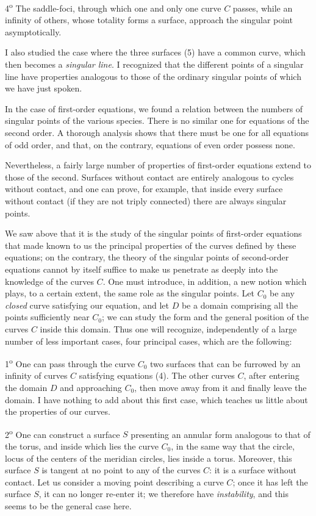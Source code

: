 \documentclass[11pt]{article}
\begin{document}
4\textsuperscript{o} The saddle-foci, through which one and only one curve $C$ passes, while an infinity of others, whose totality forms a surface, approach the singular point asymptotically.

I also studied the case where the three surfaces (5) have a common curve, which then becomes a \emph{singular line}. I recognized that the different points of a singular line have properties analogous to those of the ordinary singular points of which we have just spoken.

In the case of first-order equations, we found a relation between the numbers of singular points of the various species. There is no similar one for equations of the second order. A thorough analysis shows that there must be one for all equations of odd order, and that, on the contrary, equations of even order possess none.

Nevertheless, a fairly large number of properties of first-order equations extend to those of the second. Surfaces without contact are entirely analogous to cycles without contact, and one can prove, for example, that inside every surface without contact (if they are not triply connected) there are always singular points.

We saw above that it is the study of the singular points of first-order equations that made known to us the principal properties of the curves defined by these equations; on the contrary, the theory of the singular points of second-order equations cannot by itself suffice to make us penetrate as deeply into the knowledge of the curves $C$. One must introduce, in addition, a new notion which plays, to a certain extent, the same role as the singular points. Let $C_0$ be any \emph{closed} curve satisfying our equation, and let $D$ be a domain comprising all the points sufficiently near $C_0$; we can study the form and the general position of the curves $C$ inside this domain. Thus one will recognize, independently of a large number of less important cases, four principal cases, which are the following:

1\textsuperscript{o} One can pass through the curve $C_0$ two surfaces that can be furrowed by an infinity of curves $C$ satisfying equations (4). The other curves $C$, after entering the domain $D$ and approaching $C_0$, then move away from it and finally leave the domain. I have nothing to add about this first case, which teaches us little about the properties of our curves.

2\textsuperscript{o} One can construct a surface $S$ presenting an annular form analogous to that of the torus, and inside which lies the curve $C_0$, in the same way that the circle, locus of the centers of the meridian circles, lies inside a torus. Moreover, this surface $S$ is tangent at no point to any of the curves $C$: it is a surface without contact. Let us consider a moving point describing a curve $C$; once it has left the surface $S$, it can no longer re-enter it; we therefore have \emph{instability}, and this seems to be the general case here.
\end{document}
